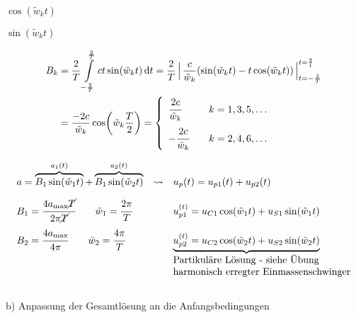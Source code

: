 \begin{solution}
\begin{minipage}[t]{.49\linewidth}

      $\cos(\tilde{w}_k t)$\\

    
\end{minipage}
\begin{minipage}[t]{.49\linewidth}

    $\sin(\tilde{w}_k t)$\\

    
\end{minipage}
\vspace{1em}

\begin{align*}
     B_k &= \frac{2}{T} \int\limits_{-\frac{2}{T}}^{\frac{2}{T}} ct \sin(\tilde{w}_k t) \dd{t} = \frac{2}{T}\,\Big|\, \frac{c}{\tilde{w}_k}(\sin(\tilde{w}_k t)-t\cos(\tilde{w}_k t))\,\Big|_{t={-\frac{2}{T}}}^{t=\frac{2}{t}} \\
     &= \frac{-2c}{\tilde{w}_k} \cos(\tilde{w}_k \frac{T}{2}) =
     \left\{
     \begin{array}{lll}
     \cfrac{2c}{\tilde{w}_k} & &k = 1,3,5,\dots\\[1em]
     -\cfrac{2c}{\tilde{w}_k} & &k = 2,4,6,\dots
     \end{array}\right.
\end{align*}

\begin{align*}
     \begin{array}{lcl}
        a = \overbrace{B_1\sin(\tilde{w}_1 t)}^{a_1(t)} + \overbrace{B_1\sin(\tilde{w}_2 t)}^{a_2(t)} & \rightsquigarrow & u_p(t) = u_{p1}(t) + u_{p2}(t) \\[1em]
        B_1 = \cfrac{4a_{\max}\cancel{T}}{2\pi\cancel{T}} \qquad \tilde{w}_1 = \cfrac{2\pi}{T} && u_{p1}^{(t)} = u_{C1} \cos(\tilde{w}_1 t) + u_{S1} \sin(\tilde{w}_1 t) \\[1em]
        B_2 = \cfrac{4a_{\max}}{4\pi} \qquad \tilde{w}_2 = \cfrac{4\pi}{T}&& \underbrace{u_{p2}^{(t)} = u_{C2} \cos(\tilde{w}_2 t) + u_{S2} \sin(\tilde{w}_2 t)} \\
        &&\text{Partikuläre Lösung - siehe Übung}\\
        &&\text{harmonisch erregter Einmassenschwinger}
    \end{array}
\end{align*}\\[2em]

b) Anpassung der Gesamtlösung an die Anfangsbedingungen
    

\end{solution}
